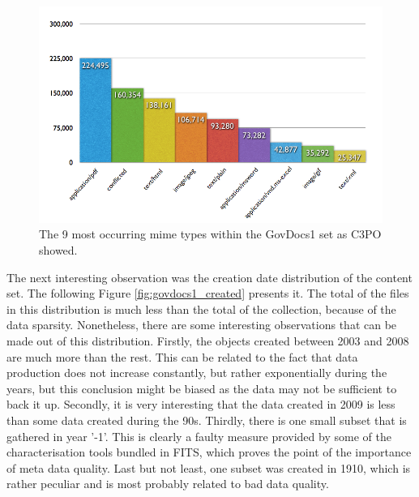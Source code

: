 \begin{figure}[th]
\begin{center}
\includegraphics[width=\textwidth]{figures/usecases/govdocs1/mimetypes_govdocs1.png}
\caption{The 9 most occurring mime types within the GovDocs1 set as C3PO showed.}
\label{fig:govdocs1_mimetypes}
\end{center}
\end{figure}

The next interesting observation was the creation date distribution of the content set.
The following Figure \ref{fig:govdocs1_created} presents it.
The total of the files in this distribution is much less than the total of the collection, because of the data sparsity.
Nonetheless, there are some interesting observations that can be made out of this distribution.
Firstly, the objects created between 2003 and 2008 are much more than the rest.
This can be related to the fact that data production does not increase constantly, but rather exponentially during the years,
but this conclusion might be biased as the data may not be sufficient to back it up.
Secondly, it is very interesting that the data created in 2009 is  less than some data created during the 90s.
Thirdly, there is one small subset that is gathered in year '-1'.
This is clearly a faulty measure provided by some of the characterisation tools bundled in FITS, which proves the point of the importance of meta data quality.
Last but not least, one subset was created in 1910, which is rather peculiar and is most probably related to bad data quality.

